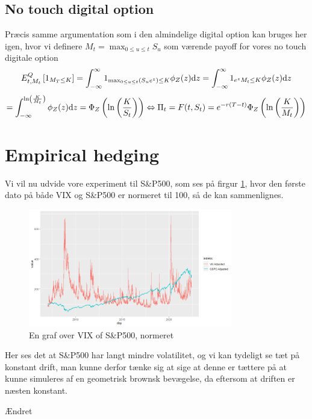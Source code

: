 \documentclass{article}
\theoremstyle{definition}
\theoremstyle{remark}
\newcommand\ens{\Leftrightarrow}
\begin{document}
\subsection{No touch digital option}
Præcis samme argumentation som i den almindelige digital option kan bruges her igen, hvor vi definere $M_t=\max_{0\leq u\leq t}S_u$ som værende payoff for vores no touch digitale option
$$E^Q_{t,M_t}\left[1_{M_T\leq K}\right]=\int_{-\infty}^{\infty}1_{\max_{0\leq u\leq t} (S_ue^{z})\leq K}\phi_Z(z)\text dz=\int_{-\infty}^{\infty}1_{e^{z}M_t\leq K}\phi_Z(z)\text dz$$
$$=\int_{-\infty}^{\ln\left(\frac K{M_t}\right)}\phi_Z(z)\text d z=\Phi_Z\left(\ln\left(\frac{K}{S_t}\right)\right)\ens \Pi_t=F(t,S_t)=e^{-r(T-t)}\Phi_Z\left(\ln\left(\frac{K}{M_t}\right)\right)$$

\section{Empirical hedging}
Vi vil nu udvide vore experiment til S\&P500, som ses på firgur \ref{fig:VIXSP500}, hvor den første dato på både VIX og S\&P500 er normeret til 100, så de kan sammenlignes.
\begin{figure}
    \centering
    \includegraphics[width=3.5in]{Rplot30.png}
    \caption{En graf over VIX of S\&P500, normeret}
    \label{fig:VIXSP500}
\end{figure}
Her ses det at S\&P500 har langt mindre volatilitet, og vi kan tydeligt se tæt på konstant drift, man kunne derfor tænke sig at sige at denne er tættere på at kunne simuleres af en geometrisk brownsk bevægelse, da eftersom at driften er næsten konstant.

Ændret
\end{document}
